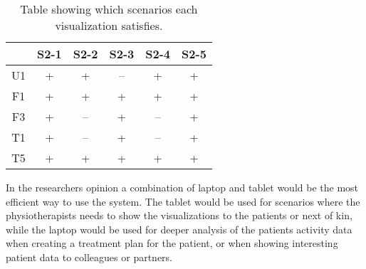 \begin{table}[h!]
  \centering
  \caption[Requirements and visualizations]{Table showing which requirements each visualization satisfies.}
  \label{tab:requirementsVisualizations}
\end{table} 

\begin{table}[h!]
  \centering
  \begin{tabular}{|c|c|c|c|c|c|}
    \hline
       & S2-1 & S2-2 & S2-3 & S2-4 & S2-5 \\ \hline
    U1 & +  & +  & -- & +  & +  \\ \hline
    F1 & +  & +  & +  & +  & +  \\ \hline
    F3 & +  & -- & +  & -- & +  \\ \hline
    T1 & +  & -- & +  & -- & +  \\ \hline
    T5 & +  & +  & +  & +  & +  \\ \hline
  \end{tabular}
  \caption[Scenarios and visualizations]{Table showing which scenarios each visualization satisfies.}
  \label{tab:scenarioVisualizations}
\end{table}

In the researchers opinion a combination of laptop and tablet would be the most efficient way to use the system. The tablet would be used for scenarios where the physiotherapists needs to show the visualizations to the patients or next of kin, while the laptop would be used for deeper analysis of the patients activity data when creating a treatment plan for the patient, or when showing interesting patient data to colleagues or partners.

